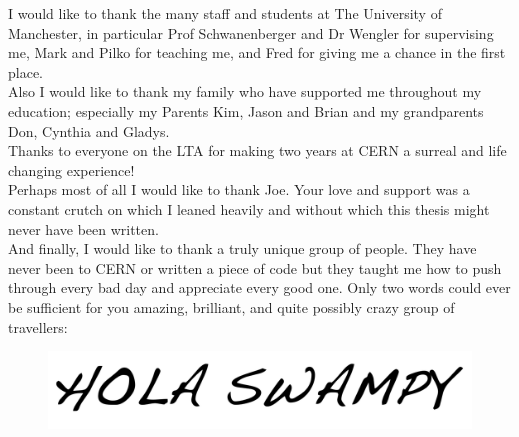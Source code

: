 I would like to thank the many staff and students at The University of Manchester, in particular Prof Schwanenberger and Dr Wengler for supervising me, Mark and Pilko for teaching me, and Fred for giving me a chance in the first place.
\vspace{5mm}
\\
Also I would like to thank my family who have supported me throughout my education; especially my Parents Kim, Jason and Brian and my grandparents Don, Cynthia and Gladys.
\vspace{5mm}
\\
Thanks to everyone on the LTA for making two years at CERN a surreal and life changing experience!
\vspace{5mm}
\\
Perhaps most of all I would like to thank Joe. Your love and support was a constant crutch on which I leaned heavily and without which this thesis might never have been written. 
\vspace{5mm}
\\
And finally, I would like to thank a truly unique group of people. They have never been to CERN or written a piece of code but they taught me how to push through every bad day and appreciate every good one. Only two words could ever be sufficient for you amazing, brilliant, and quite possibly crazy group of travellers:

\begin{figure}[h!]
     \begin{center}
     \includegraphics[width=\textwidth]{f/hola_swampy}
     \end{center}
    \end{figure}